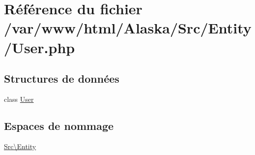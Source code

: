 \hypertarget{_user_8php}{}\section{Référence du fichier /var/www/html/\+Alaska/\+Src/\+Entity/\+User.php}
\label{_user_8php}
\subsection*{Structures de données}
\begin{DoxyCompactItemize}
\item 
class \hyperlink{class_src_1_1_entity_1_1_user}{User}
\end{DoxyCompactItemize}
\subsection*{Espaces de nommage}
\begin{DoxyCompactItemize}
\item 
 \hyperlink{namespace_src_1_1_entity}{Src\textbackslash{}\+Entity}
\end{DoxyCompactItemize}
